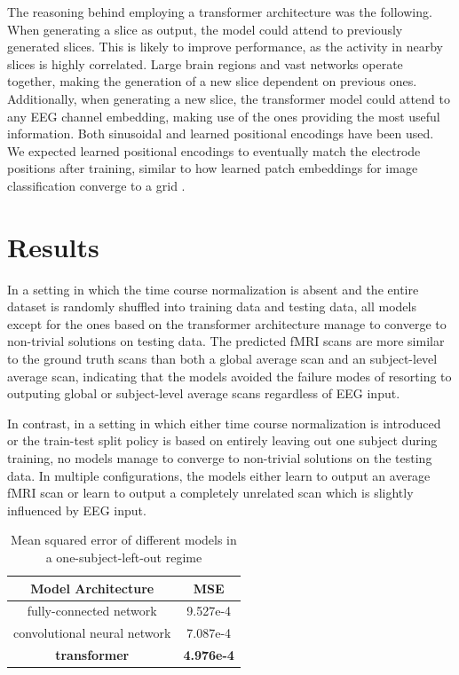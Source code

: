 \documentclass{article}
\begin{document}
The reasoning behind employing a transformer architecture was the following. When generating a slice as output, the model could attend to previously generated slices. This is likely to improve performance, as the activity in nearby slices is highly correlated. Large brain regions and vast networks operate together, making the generation of a new slice dependent on previous ones. Additionally, when generating a new slice, the transformer model could attend to any EEG channel embedding, making use of the ones providing the most useful information. Both sinusoidal and learned positional encodings have been used. We expected learned positional encodings to eventually match the electrode positions after training, similar to how learned patch embeddings for image classification converge to a grid \cite{dosovitskiy_image_2020}.

\section{Results}

In a setting in which the time course normalization is absent and the entire dataset is randomly shuffled into training data and testing data, all models except for the ones based on the transformer architecture manage to converge to non-trivial solutions on testing data. The predicted fMRI scans are more similar to the ground truth scans than both a global average scan and an subject-level  average scan, indicating that the models avoided the failure modes of resorting to outputing global or subject-level average scans regardless of EEG input.

In contrast, in a setting in which either time course normalization is introduced or the train-test split policy is based on entirely leaving out one subject during training, no models manage to converge to non-trivial solutions on the testing data. In multiple configurations, the models either learn to output an average fMRI scan or learn to output a completely unrelated scan which is slightly influenced by EEG input.

\begin{table}
\begin{center}
        \begin{tabular}{|c | c|} 
            \hline
            Model Architecture & MSE \\
            \hline
            fully-connected network & 9.527e-4 \\ 
            convolutional neural network & 7.087e-4 \\ 
            \textbf{transformer} & \textbf{4.976e-4} \\ 
            \hline
           \end{tabular}
           \caption{Mean squared error of different models in a one-subject-left-out regime}
\end{center}
\end{table}
\end{document}
